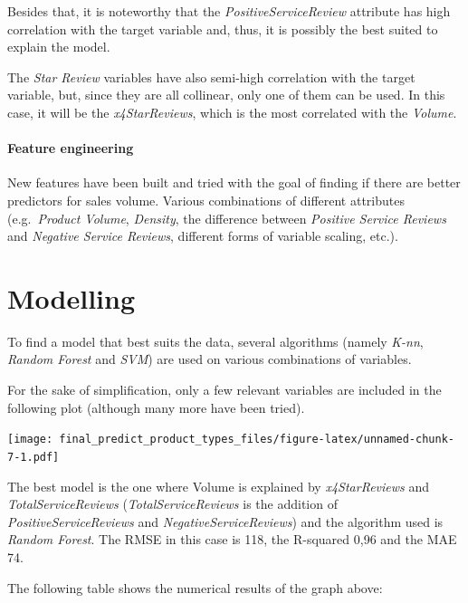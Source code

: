 \documentclass[]{article}
\let\oldparagraph\paragraph
\renewcommand{\paragraph}[1]{\oldparagraph{#1}\mbox{}}
\begin{document}
Besides that, it is noteworthy that the \emph{PositiveServiceReview}
attribute has high correlation with the target variable and, thus, it is
possibly the best suited to explain the model.

The \emph{Star Review} variables have also semi-high correlation with
the target variable, but, since they are all collinear, only one of them
can be used. In this case, it will be the \emph{x4StarReviews}, which is
the most correlated with the \emph{Volume}.

\hypertarget{feature-engineering}{%
\paragraph{Feature engineering}\label{feature-engineering}}

New features have been built and tried with the goal of finding if there
are better predictors for sales volume. Various combinations of
different attributes (e.g.~\emph{Product Volume}, \emph{Density}, the
difference between \emph{Positive Service Reviews} and \emph{Negative
Service Reviews}, different forms of variable scaling, etc.).

\hypertarget{modelling}{%
\section{Modelling}\label{modelling}}

To find a model that best suits the data, several algorithms (namely
\emph{K-nn}, \emph{Random Forest} and \emph{SVM}) are used on various
combinations of variables.

For the sake of simplification, only a few relevant variables are
included in the following plot (although many more have been tried).

\texttt{[image: final\_predict\_product\_types\_files/figure-latex/unnamed-chunk-7-1.pdf]}

The best model is the one where Volume is explained by
\emph{x4StarReviews} and \emph{TotalServiceReviews}
(\emph{TotalServiceReviews} is the addition of
\emph{PositiveServiceReviews} and \emph{NegativeServiceReviews}) and the
algorithm used is \emph{Random Forest}. The RMSE in this case is 118,
the R-squared 0,96 and the MAE 74.

The following table shows the numerical results of the graph above:
\end{document}
